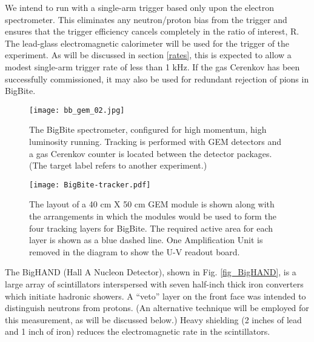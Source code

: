 \documentclass[12pt,letterpaper,oneside]{article}
\begin{document}

We intend to run with a single-arm trigger based only upon the
electron spectrometer.  This eliminates any neutron/proton bias from
the trigger and ensures that the trigger efficiency cancels completely
in the ratio of interest, R.
The lead-glass electromagnetic calorimeter will be used for the
trigger of the experiment.  
As will be discussed in section \ref{rates}, this is expected to allow
a modest single-arm trigger rate of less than 1 kHz.  
If the gas Cerenkov has been successfully commissioned, it may also be
used for redundant rejection of pions in BigBite.


\begin{figure}
\texttt{[image: bb\_gem\_02.jpg]}
\caption{\label{fig_BigBite}The BigBite spectrometer, 
configured for high momentum, high luminosity running.  
Tracking is performed with GEM detectors 
and a gas Cerenkov counter is located between the
detector packages. (The target label refers to another experiment.)}
\end{figure}

\begin{figure}
\texttt{[image: BigBite-tracker.pdf]}
\caption{\label{GEM}
The layout of a 40 cm X 50 cm GEM module is shown along with the
arrangements in which the modules would be used to form the four tracking
layers for BigBite.  The required active area for each layer is shown
as a blue dashed line.  One Amplification Unit is removed in the
diagram to show the U-V readout board. }
\end{figure}

The BigHAND (Hall A Nucleon Detector), shown in Fig.
\ref{fig_BigHAND}, 
is a large array of scintillators interspersed with seven half-inch
thick iron converters
which initiate hadronic showers.  A ``veto'' layer on the front face
was intended to distinguish neutrons from protons.  (An alternative
technique will be employed for this measurement, as will be discussed
below.)  Heavy shielding (2 inches of lead and 1 inch of iron) reduces
the electromagnetic rate in the scintillators.  
\end{document}
